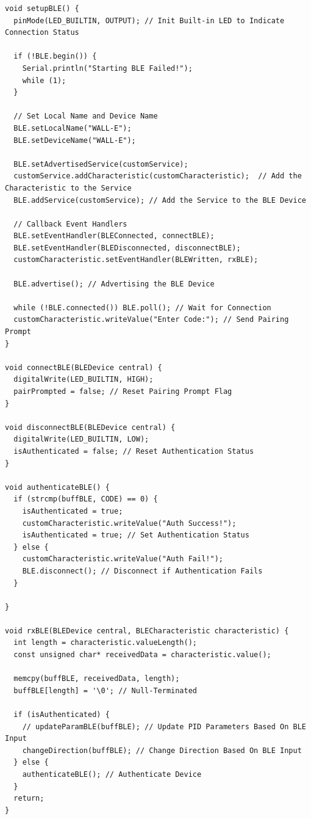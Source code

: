 \documentclass{article}
\begin{document}
\begin{lstlisting}[caption={Source Code : Arduino BLE Functionality}, label={lst:arduino_ble_code}]
void setupBLE() {
  pinMode(LED_BUILTIN, OUTPUT); // Init Built-in LED to Indicate Connection Status

  if (!BLE.begin()) {
    Serial.println("Starting BLE Failed!");
    while (1);
  }

  // Set Local Name and Device Name
  BLE.setLocalName("WALL-E");
  BLE.setDeviceName("WALL-E");

  BLE.setAdvertisedService(customService);
  customService.addCharacteristic(customCharacteristic);  // Add the Characteristic to the Service
  BLE.addService(customService); // Add the Service to the BLE Device

  // Callback Event Handlers
  BLE.setEventHandler(BLEConnected, connectBLE);
  BLE.setEventHandler(BLEDisconnected, disconnectBLE);
  customCharacteristic.setEventHandler(BLEWritten, rxBLE);

  BLE.advertise(); // Advertising the BLE Device

  while (!BLE.connected()) BLE.poll(); // Wait for Connection
  customCharacteristic.writeValue("Enter Code:"); // Send Pairing Prompt
}

void connectBLE(BLEDevice central) {
  digitalWrite(LED_BUILTIN, HIGH);
  pairPrompted = false; // Reset Pairing Prompt Flag
}

void disconnectBLE(BLEDevice central) {
  digitalWrite(LED_BUILTIN, LOW);
  isAuthenticated = false; // Reset Authentication Status
}

void authenticateBLE() {
  if (strcmp(buffBLE, CODE) == 0) {
    isAuthenticated = true;
    customCharacteristic.writeValue("Auth Success!");
    isAuthenticated = true; // Set Authentication Status
  } else {
    customCharacteristic.writeValue("Auth Fail!");
    BLE.disconnect(); // Disconnect if Authentication Fails
  }

}

void rxBLE(BLEDevice central, BLECharacteristic characteristic) {
  int length = characteristic.valueLength();
  const unsigned char* receivedData = characteristic.value();

  memcpy(buffBLE, receivedData, length);
  buffBLE[length] = '\0'; // Null-Terminated

  if (isAuthenticated) {
    // updateParamBLE(buffBLE); // Update PID Parameters Based On BLE Input
    changeDirection(buffBLE); // Change Direction Based On BLE Input
  } else {
    authenticateBLE(); // Authenticate Device
  }
  return;
}
\end{lstlisting}
\end{document}
